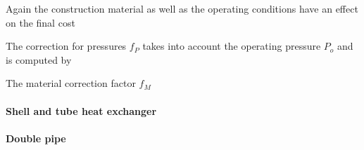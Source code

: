 		Again the construction material as well as the operating conditions have an effect on the
		final cost
		
		The correction for pressures $f_P$ takes into account the operating pressure $P_o$ and
		is computed by
		
		The material correction factor $f_M$
		
		\paragraph{Shell and tube heat exchanger}
		
		\paragraph{Double pipe}
